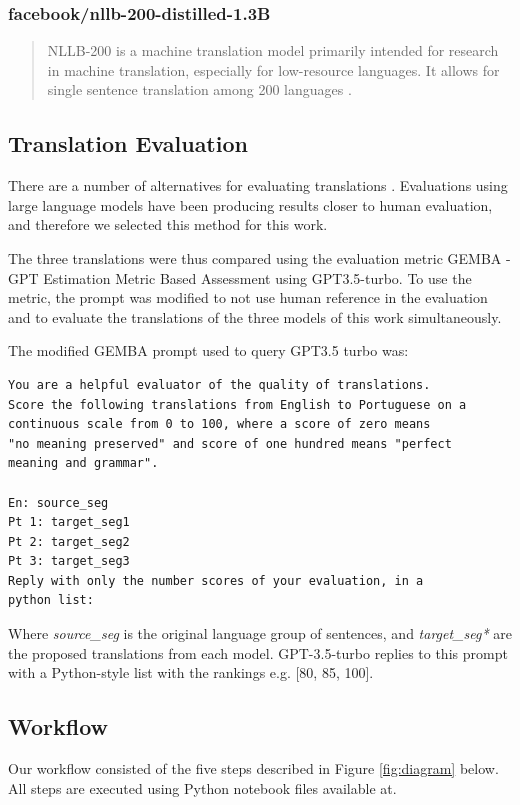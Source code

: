 \documentclass{article}
\begin{document}
\subsubsection{facebook/nllb-200-distilled-1.3B}

\begin{quote}
NLLB-200 is a machine translation model primarily intended for research in
machine translation, especially for low-resource languages. It allows for
single sentence translation among 200 languages \cite{costa2022no}.
\end{quote}

\subsection{Translation Evaluation}
\label{subsec:translation-evaluation}

There are a number of alternatives for evaluating translations
\cite{lee2023survey}. Evaluations using large language models have been producing
results closer to human evaluation, and therefore we selected this method for
this work.

The three translations were thus compared using the evaluation metric
GEMBA - GPT Estimation Metric Based Assessment \cite{kocmi2023large} using
GPT3.5-turbo. To use the metric, the prompt was modified to not use human
reference in the evaluation and to evaluate the translations of the three models
of this work simultaneously.

The modified GEMBA prompt used to query GPT3.5 turbo was:

\begin{verbatim}
You are a helpful evaluator of the quality of translations.
Score the following translations from English to Portuguese on a
continuous scale from 0 to 100, where a score of zero means
"no meaning preserved" and score of one hundred means "perfect
meaning and grammar".

En: source_seg
Pt 1: target_seg1
Pt 2: target_seg2
Pt 3: target_seg3
Reply with only the number scores of your evaluation, in a 
python list:
\end{verbatim}

Where \emph{source\_seg} is the original language group of sentences, and
\emph{target\_seg*} are the proposed translations from each model. GPT-3.5-turbo
replies to this prompt with a Python-style list with the rankings e.g. [80, 85,
100].

\subsection{Workflow}
Our workflow consisted of the five steps described in Figure
\ref{fig:diagram} below. All steps are executed using Python notebook files
available at.
\end{document}
